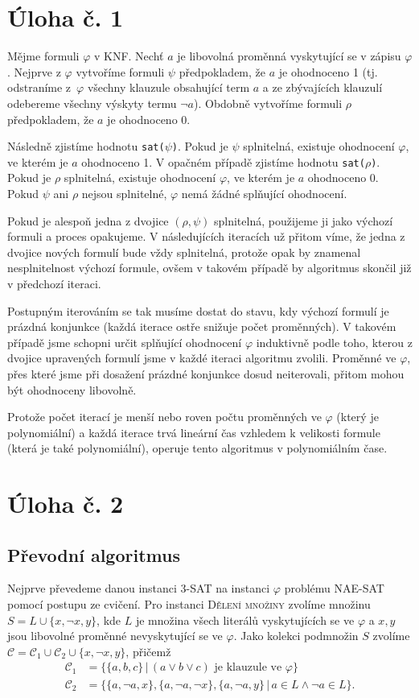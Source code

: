 \documentclass{scrartcl}
\begin{document}
\section*{Úloha č. 1}
Mějme formuli $\varphi$ v KNF. Nechť $a$ je libovolná proměnná vyskytující se v zápisu $\varphi$. Nejprve z $\varphi$ vytvoříme formuli $\psi$ předpokladem, že $a$ je ohodnoceno 1 (tj. odstraníme z~$\varphi$ všechny klauzule obsahující term $a$ a ze zbývajících klauzulí odebereme všechny výskyty termu $\neg a$). Obdobně vytvoříme formuli $\rho$ předpokladem, že $a$ je ohodnoceno 0.

Následně zjistíme hodnotu \texttt{sat($\psi$)}. Pokud je $\psi$ splnitelná, existuje ohodnocení $\varphi$, ve kterém je $a$ ohodnoceno 1. V opačném případě zjistíme hodnotu \texttt{sat($\rho$)}. Pokud je $\rho$ splnitelná, existuje ohodnocení $\varphi$, ve kterém je $a$ ohodnoceno 0. Pokud $\psi$ ani $\rho$ nejsou splnitelné, $\varphi$ nemá žádné splňující ohodnocení.

Pokud je alespoň jedna z dvojice $(\rho, \psi)$ splnitelná, použijeme ji jako výchozí formuli a proces opakujeme. V následujících iteracích už přitom víme, že jedna z dvojice nových formulí bude vždy splnitelná, protože opak by znamenal nesplnitelnost výchozí formule, ovšem v takovém případě by algoritmus skončil již v předchozí iteraci.

Postupným iterováním se tak musíme dostat do stavu, kdy výchozí formulí je prázdná konjunkce (každá iterace ostře snižuje počet proměnných). V takovém případě jsme schopni určit splňující ohodnocení $\varphi$ induktivně podle toho, kterou z dvojice upravených formulí jsme v každé iteraci algoritmu zvolili. Proměnné ve $\varphi$, přes které jsme při dosažení prázdné konjunkce dosud neiterovali, přitom mohou být ohodnoceny libovolně.

Protože počet iterací je menší nebo roven počtu proměnných ve $\varphi$ (který je polynomiální) a každá iterace trvá lineární čas vzhledem k velikosti formule (která je také polynomiální), operuje tento algoritmus v polynomiálním čase.

\section*{Úloha č. 2}
\subsection*{Převodní algoritmus}
Nejprve převedeme danou instanci \textsc{3-SAT} na instanci $\varphi$ problému \textsc{NAE-SAT} pomocí postupu ze cvičení. Pro instanci \textsc{Dělení množiny} zvolíme množinu $S = L \cup \{x, \neg x, y\}$, kde $L$ je množina všech literálů vyskytujících se ve $\varphi$ a $x, y$ jsou libovolné proměnné nevyskytující se ve $\varphi$. Jako kolekci podmnožin $S$ zvolíme $\mathcal{C} = \mathcal{C}_1 \cup \mathcal{C}_2 \cup \{x, \neg x, y\}$, přičemž 
\begin{align*}
    \mathcal{C}_1 &= \{\{a, b, c\}\,\vert\,(a\lor b\lor c)\text{ je klauzule ve }\varphi\} \\
    \mathcal{C}_2 &= \{\{a,\neg a,x\},\{a,\neg a, \neg x\},\{a, \neg a, y\}\,\vert\, a \in L \land\neg a \in L\}.
\end{align*}
\end{document}
